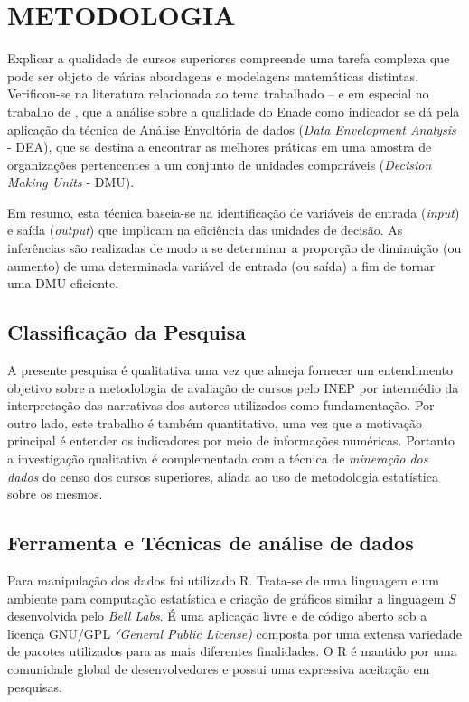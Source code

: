 \section{METODOLOGIA}

Explicar a qualidade de cursos superiores compreende uma tarefa complexa que pode ser objeto de várias abordagens e modelagens matemáticas distintas. 
Verificou-se na literatura relacionada ao tema trabalhado -- e em especial no trabalho de , que a análise sobre a qualidade do Enade como indicador se dá pela aplicação da técnica de Análise Envoltória de dados (\textit{Data Envelopment Analysis} - DEA), que se destina a encontrar as melhores práticas em uma amostra de organizações pertencentes a um conjunto de unidades comparáveis (\textit{Decision Making Units} - DMU).

Em resumo, esta técnica baseia-se na identificação de variáveis de entrada (\textit{input}) e saída (\textit{output}) que implicam na eficiência das unidades de decisão. As inferências são realizadas de modo a se determinar a proporção de diminuição (ou aumento) de uma determinada variável de entrada (ou saída) a fim de tornar uma DMU eficiente.

\subsection{Classificação da Pesquisa}
A presente pesquisa é qualitativa uma vez que almeja fornecer um entendimento objetivo sobre a metodologia de avaliação de cursos pelo INEP por intermédio da interpretação das narrativas dos autores utilizados como fundamentação. Por outro lado, este trabalho é também quantitativo, uma vez que a motivação principal é entender os indicadores por meio de informações numéricas. Portanto a investigação  qualitativa é complementada com a técnica de \textit{mineração dos dados} do censo dos cursos superiores, aliada ao uso de metodologia estatística sobre os mesmos.

\subsection{Ferramenta e Técnicas de análise de dados}
Para manipulação dos dados foi utilizado R. Trata-se de uma linguagem e um ambiente para computação estatística e criação de gráficos similar a linguagem \textit{S} desenvolvida pelo \textit{Bell Labs}. É uma aplicação livre e de código aberto sob a licença GNU/GPL \textit{(General Public License)} composta por uma extensa variedade de pacotes utilizados para as mais diferentes finalidades. O R é mantido por uma comunidade global de desenvolvedores e possui uma expressiva aceitação em pesquisas.

